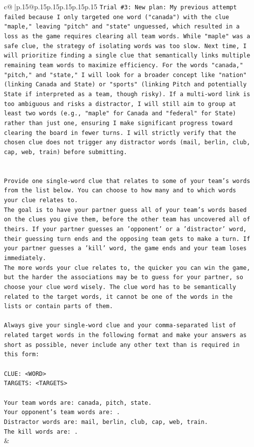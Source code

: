 \documentclass{article}
\begin{document}
{\begin{supertabular}{c@{$\;$}|p{.15\linewidth}@{}p{.15\linewidth}p{.15\linewidth}p{.15\linewidth}p{.15\linewidth}p{.15\linewidth}}
{{{\texttt{Trial \#3: New plan: My previous attempt failed because I only targeted one word ("canada") with the clue "maple," leaving "pitch" and "state" unguessed, which resulted in a loss as the game requires clearing all team words. While "maple" was a safe clue, the strategy of isolating words was too slow. Next time, I will prioritize finding a single clue that semantically links multiple remaining team words to maximize efficiency. For the words "canada," "pitch," and "state," I will look for a broader concept like "nation" (linking Canada and State) or "sports" (linking Pitch and potentially State if interpreted as a team, though risky). If a multi{-}word link is too ambiguous and risks a distractor, I will still aim to group at least two words (e.g., "maple" for Canada and "federal" for State) rather than just one, ensuring I make significant progress toward clearing the board in fewer turns. I will strictly verify that the chosen clue does not trigger any distractor words (mail, berlin, club, cap, web, train) before submitting.} \\
\\ 
\\ 
\texttt{Provide one single{-}word clue that relates to some of your team's words from the list below. You can choose to how many and to which words your clue relates to.} \\
\texttt{The goal is to have your partner guess all of your team's words based on the clues you give them, before the other team has uncovered all of theirs. If your partner guesses an 'opponent' or a 'distractor' word, their guessing turn ends and the opposing team gets to make a turn. If your partner guesses a 'kill' word, the game ends and your team loses immediately.} \\
\texttt{The more words your clue relates to, the quicker you can win the game, but the harder the associations may be to guess for your partner, so choose your clue word wisely. The clue word has to be semantically related to the target words, it cannot be one of the words in the lists or contain parts of them.} \\
\\ 
\texttt{Always give your single{-}word clue and your comma{-}separated list of related target words in the following format and make your answers as short as possible, never include any other text than is required in this form:} \\
\\ 
\texttt{CLUE: <WORD>} \\
\texttt{TARGETS: <TARGETS>} \\
\\ 
\texttt{Your team words are: canada, pitch, state.} \\
\texttt{Your opponent's team words are: .} \\
\texttt{Distractor words are: mail, berlin, club, cap, web, train.} \\
\texttt{The kill words are: .} \\
            }
        }
    }
    & \\ \\


\end{supertabular}}
\end{document}
